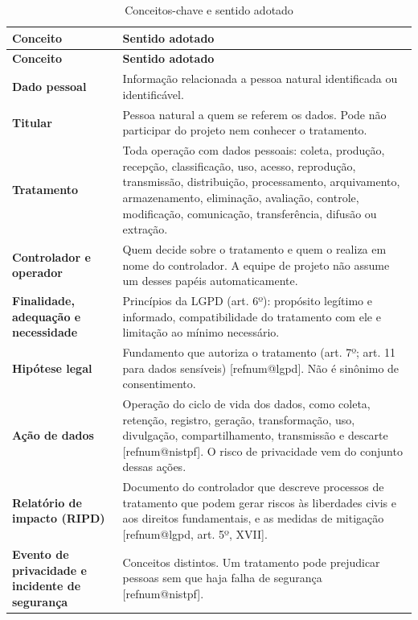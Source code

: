 \documentclass[12pt,a4paper,article,oneside,english,brazil]{abntex2}
\makeatletter
\newcommand{\fontetab}[1]{\par\vspace{3pt}{\small\noindent Fonte: #1\par}}
\newcommand{\refnum}[1]{\csname refnum@#1\endcsname}
\newcommand{\cit}[1]{[\refnum{#1}]}
\makeatother
\begin{document}
\begingroup\SingleSpacing\small
\begin{longtable}{@{}>{\raggedright\arraybackslash}p{}>{\raggedright\arraybackslash}p{}@{}}
\caption{Conceitos-chave e sentido adotado}\label{tab:t2}\\
\hline
\textbf{Conceito} & \textbf{Sentido adotado}\\
\hline
\endfirsthead
\hline
\textbf{Conceito} & \textbf{Sentido adotado}\\
\hline
\endhead
\hline
\endfoot
\hline
\endlastfoot
\textbf{Dado pessoal} & Informação relacionada a pessoa natural identificada ou identificável.\\[3pt]
\textbf{Titular} & Pessoa natural a quem se referem os dados. Pode não participar do projeto nem conhecer o tratamento.\\[3pt]
\textbf{Tratamento} & Toda operação com dados pessoais: coleta, produção, recepção, classificação, uso, acesso, reprodução, transmissão, distribuição, processamento, arquivamento, armazenamento, eliminação, avaliação, controle, modificação, comunicação, transferência, difusão ou extração.\\[3pt]
\textbf{Controlador e operador} & Quem decide sobre o tratamento e quem o realiza em nome do controlador. A equipe de projeto não assume um desses papéis automaticamente.\\[3pt]
\textbf{Finalidade, adequação e necessidade} & Princípios da LGPD (art. 6º): propósito legítimo e informado, compatibilidade do tratamento com ele e limitação ao mínimo necessário.\\[3pt]
\textbf{Hipótese legal} & Fundamento que autoriza o tratamento (art. 7º; art. 11 para dados sensíveis) [\refnum{lgpd}]. Não é sinônimo de consentimento.\\[3pt]
\textbf{Ação de dados} & Operação do ciclo de vida dos dados, como coleta, retenção, registro, geração, transformação, uso, divulgação, compartilhamento, transmissão e descarte [\refnum{nistpf}]. O risco de privacidade vem do conjunto dessas ações.\\[3pt]
\textbf{Relatório de impacto (RIPD)} & Documento do controlador que descreve processos de tratamento que podem gerar riscos às liberdades civis e aos direitos fundamentais, e as medidas de mitigação [\refnum{lgpd}, art. 5º, XVII].\\[3pt]
\textbf{Evento de privacidade e incidente de segurança} & Conceitos distintos. Um tratamento pode prejudicar pessoas sem que haja falha de segurança [\refnum{nistpf}].\\[3pt]
\end{longtable}
\endgroup
\fontetab{Elaborado pelos autores (2026), a partir de \cit{lgpd} e \cit{nistpf}.}
\end{document}
